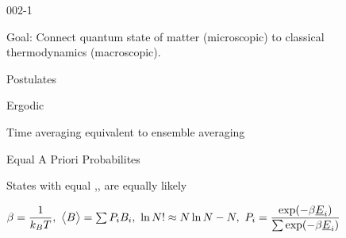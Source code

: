 \begin{mitframe}{002-1} %

    
\begin{listone}
    
    \item Goal: Connect quantum state of matter (microscopic) to classical thermodynamics (macroscopic).
    
    \item Postulates
    
    \begin{listtwo}
    
    	\item Ergodic
        
        \begin{listthree}
        
    		\item Time averaging equivalent to ensemble averaging

		\end{listthree}

    	\item Equal A Priori Probabilites
        
       	\begin{listthree}
        
    		\item States with equal \nummoles,\uline{\vol},\uline{\energy} are equally likely
    
    	\end{listthree}
    
    \end{listtwo}
    
    \item $\boltznorm = \dfrac{1}{\boltz\Temp},~\big\langle\exergy\big\rangle = \sum\nolimits\prob{i}\virialcoeff{i},~\ln\nummoles!\approx \nummoles\ln\nummoles - \nummoles,~\prob{i} = \dfrac{\exp(-\boltznorm\uline{\energy}_{\state})}{\sum\nolimits\exp(-\boltznorm\uline{\energy}_{\state})}$
 
    
 
 
 
\end{listone}
     
\end{mitframe}